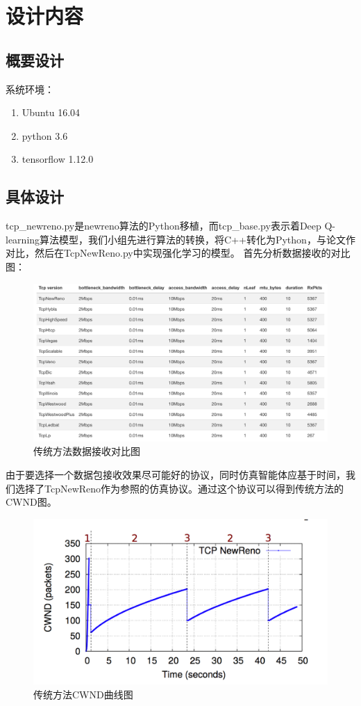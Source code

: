 
\section{设计内容}

\subsection{概要设计}

系统环境：
\begin{enumerate}
\item Ubuntu 16.04
\item python 3.6
\item tensorflow 1.12.0
\end{enumerate}

\subsection{具体设计}

tcp\_newreno.py是newreno算法的Python移植，而tcp\_base.py表示着Deep Q-learning算法模型，我们小组先进行算法的转换，将C++转化为Python，与论文作对比，然后在TcpNewReno.py中实现强化学习的模型。
首先分析数据接收的对比图：

\begin{figure}[h]
	\centering
	\includegraphics[width=0.8\linewidth]{figure/figure1.png}
	\caption{传统方法数据接收对比图}
	\label{figure1}
\end{figure}

由于要选择一个数据包接收效果尽可能好的协议，同时仿真智能体应基于时间，我们选择了TcpNewReno作为参照的仿真协议。通过这个协议可以得到传统方法的CWND图。

\begin{figure}[h]
	\centering
	\includegraphics[width=0.6\linewidth]{figure/figure2.png}
	\caption{传统方法CWND曲线图}
	\label{figure2}
\end{figure}

